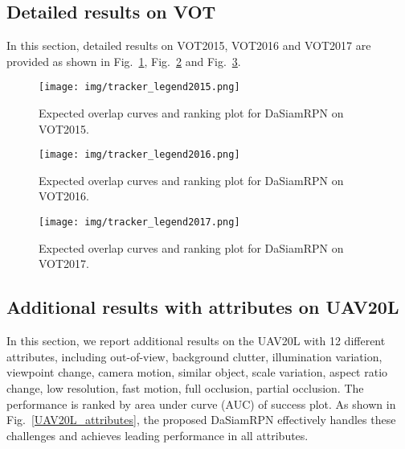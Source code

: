 \documentclass[runningheads]{llncs}
\begin{document}
\subsection{Detailed results on VOT}
In this section, detailed results on VOT2015, VOT2016 and VOT2017 are provided as shown in Fig.~\ref{vot2015}, Fig.~\ref{vot2016} and Fig.~\ref{vot2017}.

\begin{figure}[htbp]
\centering
{}
\hfil
\texttt{[image: img/tracker\_legend2015.png]}
\caption{Expected overlap curves and ranking plot for DaSiamRPN on VOT2015.}
\label{vot2015}
\end{figure}




\begin{figure}[htbp]
\centering
{}
\hfil
\texttt{[image: img/tracker\_legend2016.png]}
\caption{Expected overlap curves and ranking plot for DaSiamRPN on VOT2016.}
\label{vot2016}
\end{figure}



\begin{figure}[htbp]
\centering
{}
\hfil
\texttt{[image: img/tracker\_legend2017.png]}
\caption{Expected overlap curves and ranking plot for DaSiamRPN on VOT2017.}
\label{vot2017}
\end{figure}




\subsection{Additional results with attributes on UAV20L}
In this section, we report additional results on the UAV20L with 12 different attributes, including out-of-view, background clutter, illumination variation, viewpoint change, camera motion, similar object, scale variation, aspect ratio change, low resolution, fast motion, full occlusion, partial occlusion. The performance is ranked by area under curve (AUC) of success plot. As shown in Fig.~\ref{UAV20L_attributes}, the proposed DaSiamRPN effectively handles these challenges and achieves leading performance in all attributes.
\end{document}

